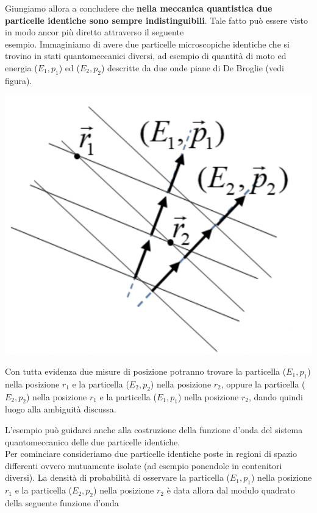Giungiamo allora a concludere che \textbf{nella meccanica quantistica
	due particelle identiche sono sempre indistinguibili}.
Tale fatto può
essere visto in modo ancor più diretto attraverso il seguente\\
esempio.
Immaginiamo di avere due particelle microscopiche identiche che
si trovino in stati quantomeccanici diversi, ad esempio di quantità di
moto ed energia (\(E_1, p_1\)) ed (\(E_2, p_2\)) descritte da due onde
piane di De Broglie (vedi figura).\\
\begin{marginfigure}
	\includegraphics{figs/identical-part2}
	\label{fig:identical-part2}
\end{marginfigure}
Con tutta evidenza due misure di posizione potranno trovare la
particella (\(E_{1},p_{1}\)) nella posizione \(r_{1}\) e la particella
(\(E_{2},p_{2}\)) nella posizione \(r_{2}\), oppure la particella
(\(E_{2}, p_{2}\)) nella posizione \(r_{1}\) e la particella
(\(E_{1}, p_{1}\)) nella posizione \(r_{2}\), dando quindi luogo alla
ambiguità discussa.

L'esempio può guidarci anche alla costruzione della funzione d'onda del
sistema quantomeccanico delle due particelle identiche.\\
Per cominciare consideriamo due particelle identiche poste in regioni di
spazio differenti ovvero mutuamente isolate (ad esempio ponendole in
contenitori diversi).
La densità di probabilità di osservare la
particella (\(E_{1},p_{1}\)) nella posizione \(r_{1}\) e la particella
(\(E_{2},p_{2}\)) nella posizione \(r_{2}\) è data allora dal modulo
quadrato della seguente funzione d'onda

